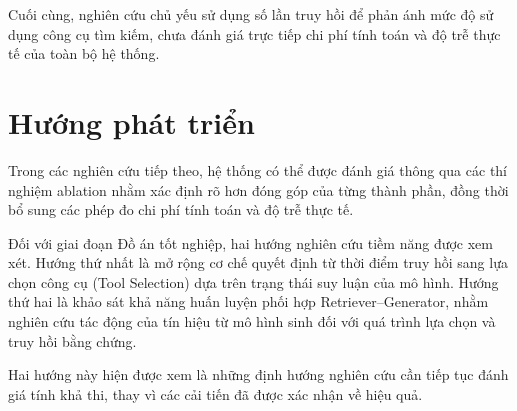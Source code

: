 Cuối cùng, nghiên cứu chủ yếu sử dụng số lần truy hồi để phản ánh mức độ sử dụng công cụ tìm kiếm, chưa đánh giá trực tiếp chi phí tính toán và độ trễ thực tế của toàn bộ hệ thống.

\section{Hướng phát triển}

Trong các nghiên cứu tiếp theo, hệ thống có thể được đánh giá thông qua các thí nghiệm ablation nhằm xác định rõ hơn đóng góp của từng thành phần, đồng thời bổ sung các phép đo chi phí tính toán và độ trễ thực tế.

Đối với giai đoạn Đồ án tốt nghiệp, hai hướng nghiên cứu tiềm năng được xem xét. Hướng thứ nhất là mở rộng cơ chế quyết định từ thời điểm truy hồi sang lựa chọn công cụ (Tool Selection) dựa trên trạng thái suy luận của mô hình. Hướng thứ hai là khảo sát khả năng huấn luyện phối hợp Retriever–Generator, nhằm nghiên cứu tác động của tín hiệu từ mô hình sinh đối với quá trình lựa chọn và truy hồi bằng chứng.

Hai hướng này hiện được xem là những định hướng nghiên cứu cần tiếp tục đánh giá tính khả thi, thay vì các cải tiến đã được xác nhận về hiệu quả.
